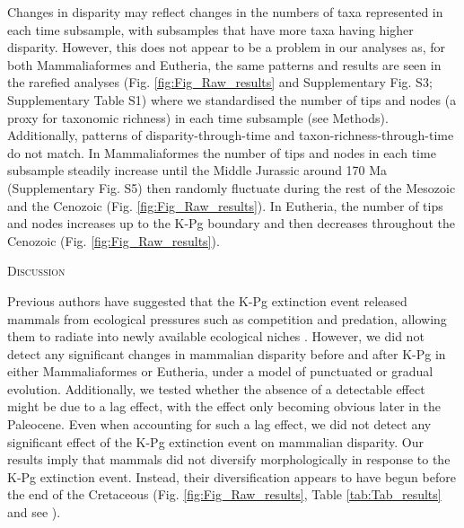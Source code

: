 \documentclass[12pt,letterpaper]{article}
\renewcommand{\section}[1]{%
\bigskip
\begin{center}
\begin{Large}
\normalfont\scshape #1
\medskip
\end{Large}
\end{center}}
\begin{document}
Changes in disparity may reflect changes in the numbers of taxa represented in each time subsample, with subsamples that have more taxa having higher disparity. 
However, this does not appear to be a problem in our analyses as, for both Mammaliaformes and Eutheria, the same patterns and results are seen in the rarefied analyses (Fig. \ref{fig:Fig_Raw_results} and Supplementary Fig. S3; Supplementary Table S1) where we standardised the number of tips and nodes (a proxy for taxonomic richness) in each time subsample (see Methods).
Additionally, patterns of disparity-through-time and taxon-richness-through-time do not match.
In Mammaliaformes the number of tips and nodes in each time subsample steadily increase until the Middle Jurassic around 170 Ma (Supplementary Fig. S5) then randomly fluctuate during the rest of the Mesozoic and the Cenozoic (Fig. \ref{fig:Fig_Raw_results}).
In Eutheria, the number of tips and nodes increases up to the K-Pg boundary and then decreases throughout the Cenozoic (Fig. \ref{fig:Fig_Raw_results}).

%
%

\section{Discussion}
Previous authors have suggested that the K-Pg extinction event released mammals from ecological pressures such as competition and predation, allowing them to radiate into newly available ecological niches \cite{archibald2011extinction,OLeary08022013,Lovergrove,Slater2012MEE}.
However, we did not detect any significant changes in mammalian disparity before and after K-Pg in either Mammaliaformes or Eutheria, under a model of punctuated or gradual evolution.
Additionally, we tested whether the absence of a detectable effect might be due to a lag effect, with the effect only becoming obvious later in the Paleocene.
Even when accounting for such a lag effect, we did not detect any significant effect of the K-Pg extinction event on mammalian disparity.
Our results imply that mammals did not diversify morphologically in response to the K-Pg extinction event.
Instead, their diversification appears to have begun before the end of the Cretaceous (Fig. \ref{fig:Fig_Raw_results}, Table \ref{tab:Tab_results} and see \cite{meredithimpacts2011,dosReis2014,Close2015,Lee2015R759}).
\end{document}
